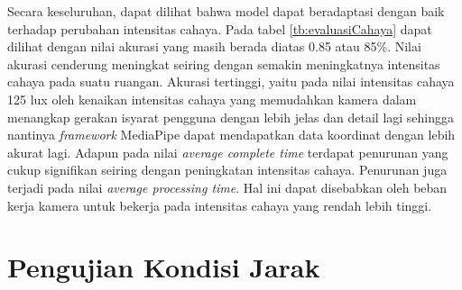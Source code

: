 Secara keseluruhan, dapat dilihat bahwa model dapat beradaptasi dengan baik terhadap perubahan intensitas cahaya. Pada tabel \ref{tb:evaluasiCahaya} dapat dilihat dengan nilai akurasi yang masih berada diatas 0.85 atau 85\%. Nilai akurasi cenderung meningkat seiring dengan semakin meningkatnya intensitas cahaya pada suatu ruangan. Akurasi tertinggi, yaitu pada nilai intensitas cahaya 125 lux oleh kenaikan intensitas cahaya yang memudahkan kamera dalam menangkap gerakan isyarat pengguna dengan lebih jelas dan detail lagi sehingga nantinya \emph{framework} MediaPipe dapat mendapatkan data koordinat dengan lebih akurat lagi. Adapun pada nilai \emph{average complete time} terdapat penurunan yang cukup signifikan seiring dengan peningkatan intensitas cahaya. Penurunan juga terjadi pada nilai \emph{average processing time}. Hal ini dapat disebabkan oleh beban kerja kamera untuk bekerja pada intensitas cahaya yang rendah lebih tinggi.

\newpage
\section{Pengujian Kondisi Jarak}
\label{sec:analisisjarak}

